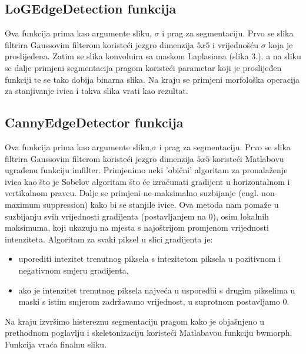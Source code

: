 ﻿\documentclass[conference]{IEEEtran}
\begin{document}
 \subsection{LoGEdgeDetection funkcija}
 Ova funkcija prima kao argumente sliku, $\sigma$ i prag za segmentaciju. Prvo se slika filtrira Gaussovim filterom koristeći jezgro dimenzija $5x5$  i vrijednošću $\sigma$ koja je proslijeđena. Zatim se slika konvoluira sa maskom Laplasiana (slika 3.). a na  sliku se dalje primjeni segmentacija pragom koristeći parametar koji je proslijeđen funkciji te se tako dobija binarna slika. Na kraju se primjeni morfološka operacija za stanjivanje ivica i takva slika vrati kao rezultat.  

\subsection{CannyEdgeDetector funkcija}
Ova funkcija prima kao argumente sliku,$\sigma$ i prag za segmentaciju. Prvo se slika filtrira Gaussovim filterom koristeći jezgro dimenzija $5x5$ koristeći Matlabovu ugrađenu funkciju imfilter. Primjenimo neki 'obični' algoritam za pronalaženje ivica kao što je Sobelov algoritam što će izračunati gradijent u horizontalnom i vertikalnom pravcu. Dalje se primjeni ne-maksimalno suzbijanje (engl. non-maximum suppression) kako bi se stanjile ivice. Ova metoda nam pomaže u suzbijanju svih vrijednosti gradijenta (postavljanjem na 0), osim lokalnih maksimuma, koji ukazuju na mjesta s najoštrijom promjenom vrijednosti intenziteta. Algoritam za svaki piksel u slici gradijenta je:
\begin{itemize}
    \item uporediti intezitet  trenutnog piksela s intezitetom  piksela u pozitivnom i negativnom smjeru gradijenta,
    \item ako je intenzitet trenutnog piksela najveća u usporedbi s drugim pikselima u maski s istim smjerom zadržavamo vrijednost, u suprotnom postavljamo 0.
\end{itemize}
Na kraju izvršimo histereznu segmentaciju pragom kako je objašnjeno u prethodnom poglavlju i skeletonizaciju koristeći Matlabavou funkciju bwmorph. Funkcija vraća finalnu sliku. 
\end{document}
